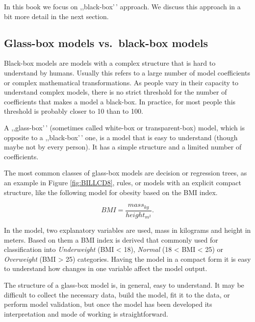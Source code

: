\documentclass[12pt,]{krantz}
\begin{document}
In this book we focus on ,,black-box'\,' approach. We discuss this approach in a bit more detail in the next section.

\hypertarget{glass-box-models-vs.-black-box-models}{%
\subsection{Glass-box models vs.~black-box models}\label{glass-box-models-vs.-black-box-models}}

Black-box models are models with a complex structure that is hard to understand by humans. Usually this refers to a large number of model coefficients or complex mathematical transformations. As people vary in their capacity to understand complex models, there is no strict threshold for the number of coefficients that makes a model a black-box. In practice, for most people this threshold is probably closer to 10 than to 100.

A ,,glass-box'\,' (sometimes called white-box or transparent-box) model, which is opposite to a ,,black-box'\,' one, is a model that is easy to understand (though maybe not by every person). It has a simple structure and a limited number of coefficients.

The most common classes of glass-box models are decision or regression trees, as an example in Figure \ref{fig:BILLCD8}, rules, or models with an explicit compact structure, like the following model for obesity based on the BMI index.

\[
BMI = \frac{mass_{kg}}{height_{m^2}}.
\]

In the model, two explanatory variables are used, mass in kilograms and height in meters. Based on them a BMI index is derived that commonly used for classification into \emph{Underweight} (BMI \textless{} 18), \emph{Normal} (18 \textless{} BMI \textless{} 25) or \emph{Overweight} (BMI \textgreater{} 25) categories. Having the model in a compact form it is easy to understand how changes in one variable affect the model output.

The structure of a glass-box model is, in general, easy to understand. It may be difficult to collect the necessary data, build the model, fit it to the data, or perform model validation, but once the model has been developed its interpretation and mode of working is straightforward.
\end{document}
